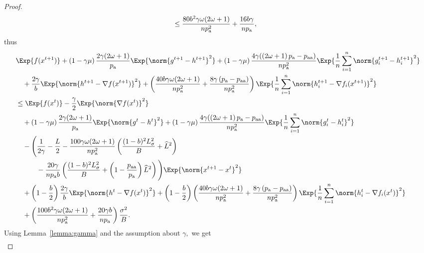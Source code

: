 \documentclass{article}
\newcommand*{\probavailable}{\ensuremath{p_{\textnormal{a}}}}
\newcommand*{\probpairaa}{\ensuremath{p_{\textnormal{aa}}}}
\begin{document}
\begin{proof}
\begin{align*}
        &\leq \frac{80 b^2 \gamma \omega (2 \omega + 1)}{n \probavailable^2} + \frac{16 b \gamma}{n \probavailable},
      \end{align*}
      thus
      \begin{align*}
        &\Exp{f(x^{t + 1})} + \left(1 - \gamma \mu\right)\frac{2\gamma (2 \omega + 1)}{\probavailable} \Exp{\norm{g^{t+1} - h^{t+1}}^2} + \left(1 - \gamma \mu\right)\frac{4\gamma (\left(2 \omega + 1\right)\probavailable - \probpairaa)}{n \probavailable^2} \Exp{\frac{1}{n}\sum_{i=1}^n\norm{g^{t+1}_i - h^{t+1}_i}^2}\\
        &\quad  + \frac{2\gamma}{b} \Exp{\norm{h^{t+1} - \nabla f(x^{t+1})}^2} + \left(\frac{40 b \gamma \omega (2 \omega + 1)}{n \probavailable^2} + \frac{8 \gamma \left(\probavailable - \probpairaa\right)}{n \probavailable^2}\right) \Exp{\frac{1}{n}\sum_{i=1}^n\norm{h^{t+1}_i - \nabla f_i(x^{t+1})}^2}\\
        &\leq \Exp{f(x^t)} - \frac{\gamma}{2}\Exp{\norm{\nabla f(x^t)}^2} \\
        &\quad + \left(1 - \gamma \mu\right)\frac{2\gamma (2 \omega + 1)}{\probavailable} \Exp{\norm{g^{t} - h^{t}}^2} + \left(1 - \gamma \mu\right)\frac{4\gamma (\left(2 \omega + 1\right)\probavailable - \probpairaa)}{n \probavailable^2} \Exp{\frac{1}{n}\sum_{i=1}^n\norm{g^{t}_i - h^{t}_i}^2} \\
        &\quad - \Bigg(\frac{1}{2\gamma} - \frac{L}{2} - \frac{100 \gamma \omega (2 \omega + 1)}{n \probavailable^2} \left(\frac{(1 - b)^2 L_{\sigma}^2}{B} + \widehat{L}^2\right) \\
        &\qquad\quad - \frac{20 \gamma}{n \probavailable b}\left(\frac{(1 - b)^2 L_{\sigma}^2}{B} + \left(1 - \frac{\probpairaa}{\probavailable}\right) \widehat{L}^2 \right)\Bigg) \Exp{\norm{x^{t+1} - x^t}^2} \\
        &\quad + \left(1 - \frac{b}{2}\right)\frac{2\gamma}{b} \Exp{\norm{h^{t} - \nabla f(x^{t})}^2} + \left(1 - \frac{b}{2}\right)\left(\frac{40 b \gamma \omega (2 \omega + 1)}{n \probavailable^2} + \frac{8 \gamma \left(\probavailable - \probpairaa\right)}{n \probavailable^2}\right)\Exp{\frac{1}{n}\sum_{i=1}^n\norm{h^{t}_i - \nabla f_i(x^{t})}^2} \\
        &\quad + \left(\frac{100 b^2 \gamma \omega (2 \omega + 1)}{n \probavailable^2} + \frac{20 \gamma b}{n \probavailable}\right) \frac{\sigma^2}{B}.
      \end{align*}
      Using Lemma~\ref{lemma:gamma} and the assumption about $\gamma,$ we get
      \begin{align*}

\end{align*}
\end{proof}
\end{document}
